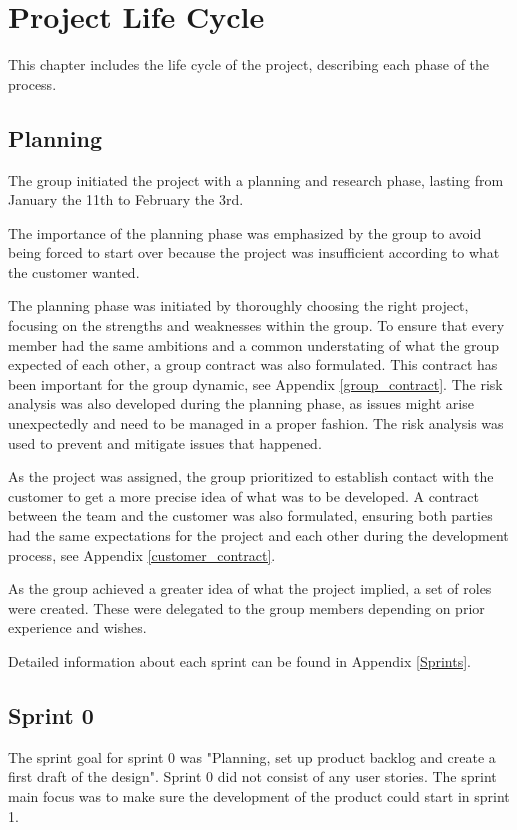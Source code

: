 
\chapter{Project Life Cycle}
This chapter includes the life cycle of the project, describing each phase of the process.

\section{Planning}
The group initiated the project with a planning and research phase, lasting from January the 11th to February the 3rd. 

The importance of the planning phase was emphasized by the group to avoid being forced to start over because the project was insufficient according to what the customer wanted.

The planning phase was initiated by thoroughly choosing the right project, focusing on the strengths and weaknesses within the group. To ensure that every member had the same ambitions and a common understating of what the group expected of each other, a group contract was also formulated. This contract has been important for the group dynamic, see Appendix \ref{group_contract}. The risk analysis was also developed during the planning phase, as issues might arise unexpectedly and need to be managed in a proper fashion. The risk analysis was used to prevent and mitigate issues that happened.  

As the project was assigned, the group prioritized to establish contact with the customer to get a more precise idea of what was to be developed. A contract between the team and the customer was also formulated, ensuring both parties had the same expectations for the project and each other during the development process, see Appendix \ref{customer_contract}.

As the group achieved a greater idea of what the project implied, a set of roles were created. These were delegated to the group members depending on prior experience and wishes.

Detailed information about each sprint can be found in Appendix \ref{Sprints}.


\section{Sprint 0}
\label{sprint0}
The sprint goal for sprint 0 was "Planning, set up product backlog and create a first draft of the design". Sprint 0 did not consist of any user stories. The sprint main focus was to make sure the development of the product could start in sprint 1. 

